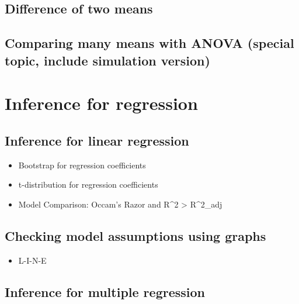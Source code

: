 \documentclass[]{book}
\providecommand{\tightlist}{%
  \setlength{\itemsep}{0pt}\setlength{\parskip}{0pt}}
\begin{document}
\hypertarget{difference-of-two-means}{%
\section{Difference of two means}\label{difference-of-two-means}}

\hypertarget{comparing-many-means-with-anova-special-topic-include-simulation-version}{%
\section{Comparing many means with ANOVA (special topic, include simulation version)}\label{comparing-many-means-with-anova-special-topic-include-simulation-version}}

\hypertarget{inference-reg}{%
\chapter{Inference for regression}\label{inference-reg}}

\hypertarget{inference-for-linear-regression}{%
\section{Inference for linear regression}\label{inference-for-linear-regression}}

\begin{itemize}
\tightlist
\item
  Bootstrap for regression coefficients
\item
  t-distribution for regression coefficients
\item
  Model Comparison: Occam's Razor and R\^{}2 \textgreater{} R\^{}2\_adj
\end{itemize}

\hypertarget{checking-model-assumptions-using-graphs}{%
\section{Checking model assumptions using graphs}\label{checking-model-assumptions-using-graphs}}

\begin{itemize}
\tightlist
\item
  L-I-N-E
\end{itemize}

\hypertarget{inference-for-multiple-regression}{%
\section{Inference for multiple regression}\label{inference-for-multiple-regression}}
\end{document}
